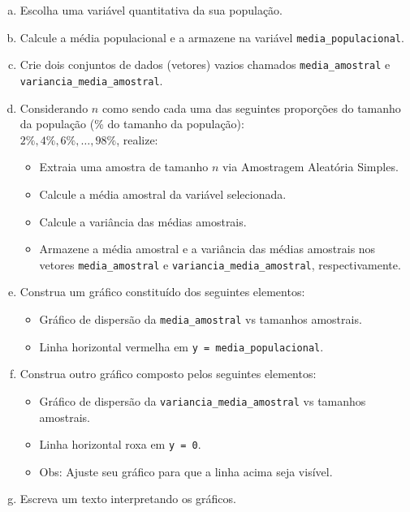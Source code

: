 \documentclass[12pt]{article}
\begin{document}
\begin{enumerate}[a)]
    \item Escolha uma variável quantitativa da sua população.
    \item Calcule a média populacional e a armazene na variável \texttt{media\_populacional}.
    \item Crie dois conjuntos de dados (vetores) vazios chamados \texttt{media\_amostral} e \texttt{variancia\_media\_amostral}.
    \item Considerando $n$ como sendo cada uma das seguintes proporções do tamanho da população (\% do tamanho da população):\\
    $2\%, 4\%, 6\%, \dots, 98\%$, realize:
        \begin{itemize}
            \item Extraia uma amostra de tamanho $n$ via Amostragem Aleatória Simples.
            \item Calcule a média amostral da variável selecionada.
            \item Calcule a variância das médias amostrais. 
            \item Armazene a média amostral e a variância das médias amostrais nos vetores \texttt{media\_amostral} e \texttt{variancia\_media\_amostral}, respectivamente.
        \end{itemize}
    \item Construa um gráfico constituído dos seguintes elementos:
        \begin{itemize}
            \item Gráfico de dispersão da \texttt{media\_amostral} vs tamanhos amostrais.
            \item Linha horizontal vermelha em \texttt{y = media\_populacional}.
        \end{itemize}
    \item Construa outro gráfico composto pelos seguintes elementos:
    \begin{itemize}
        \item Gráfico de dispersão da \texttt{variancia\_media\_amostral} vs tamanhos amostrais.
        \item Linha horizontal roxa em \texttt{y = 0}.
        \item Obs: Ajuste seu gráfico para que a linha acima seja visível. 
    \end{itemize}
    \item Escreva um texto interpretando os gráficos.
\end{enumerate}
\end{document}
